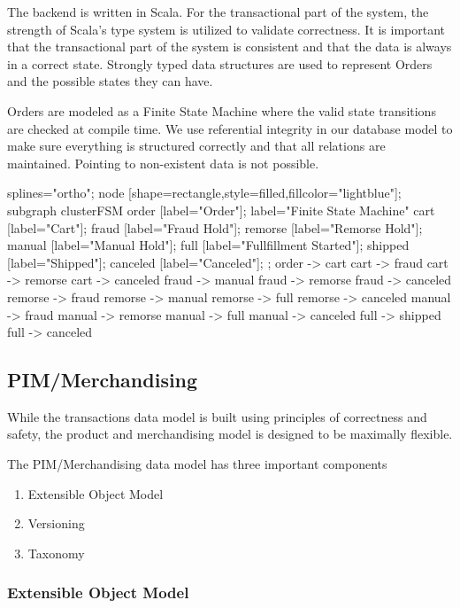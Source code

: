 \documentclass[11pt]{article}
\begin{document}
The backend is written in Scala. For the transactional part of the system, 
the strength of Scala's type system is utilized to validate correctness.
It is important that the transactional part of the system is consistent and that
the data is always in a correct state. Strongly typed data structures
are used to represent Orders and the possible states they can have. 

Orders are modeled as a Finite State Machine where the valid state transitions
are checked at compile time. We use referential integrity in our database
model to make sure everything is structured correctly and that all relations
are maintained. Pointing to non-existent data is not possible.

 {
    splines="ortho";
    node [shape=rectangle,style=filled,fillcolor="lightblue"];
    subgraph clusterFSM {
        order [label="Order"];
        label="Finite State Machine"
        cart [label="Cart"];
        fraud [label="Fraud Hold"];
        remorse [label="Remorse Hold"];
        manual [label="Manual Hold"];
        full [label="Fullfillment Started"];
        shipped [label="Shipped"];
        canceled [label="Canceled"];
    };
    order -> cart
    cart -> fraud
    cart -> remorse
    cart -> canceled
    fraud -> manual
    fraud -> remorse
    fraud -> canceled
    remorse -> fraud
    remorse -> manual
    remorse -> full
    remorse -> canceled
    manual -> fraud
    manual -> remorse
    manual -> full
    manual -> canceled
    full -> shipped
    full -> canceled
}

\subsection{PIM/Merchandising}

While the transactions data model is built using principles of correctness and 
safety, the product and merchandising model is designed to be maximally flexible.

The PIM/Merchandising data model has three important components

\begin{enumerate}
    \item Extensible Object Model
    \item Versioning
    \item Taxonomy
\end{enumerate}

\subsubsection{Extensible Object Model}
\end{document}
